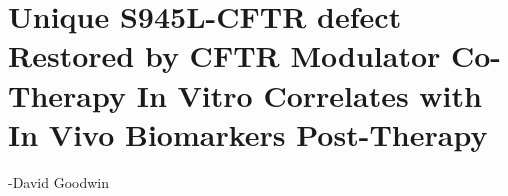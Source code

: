 \chapter{Unique S945L-CFTR defect Restored by CFTR Modulator Co-Therapy In Vitro Correlates with In Vivo Biomarkers Post-Therapy}
 {-David Goodwin}
\label{chap:s945l}
